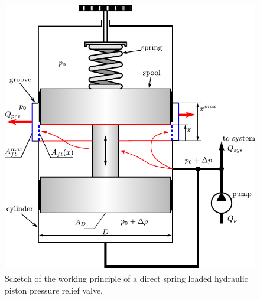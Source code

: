 \begin{figure}[ht!]
	\centering
		\includegraphics[height=12cm]{PositiveDisplacementPumps/Figures/Direct_Spring_Loaded_PRV.pdf}
	\caption{Scketch of the working principle of a direct spring loaded hydraulic piston pressure relief valve.}
	\label{fig:direct_spring_loaded_PRV}
\end{figure}

